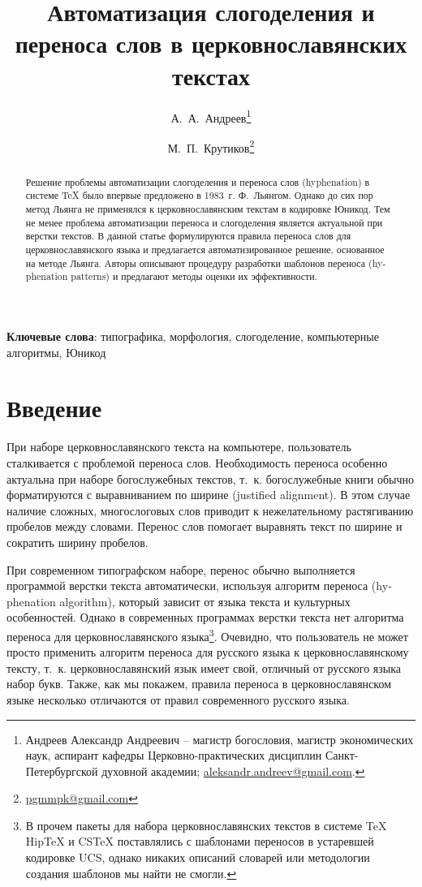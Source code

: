 \documentclass[12pt,a4paper,oneside]{extarticle}
\title{Автоматизация слогоделения и переноса слов в церковнославянских текстах}
\author{А.~А.~Андреев\thanks{Андреев Александр Андреевич -- магистр богословия, магистр экономических наук, аспирант кафедры Церковно-практических дисциплин Санкт-Петербургской духовной академии; \url{aleksandr.andreev@gmail.com}.} \and М.~П.~Крутиков\thanks{\url{pgmmpk@gmail.com}}}
\date{\vspace{-1em}}  %
\providecommand{\keywords}[1]{\textbf{Ключевые слова}: #1}
\begin{document}
\maketitle

\begin{abstract}
Решение проблемы автоматизации слогоделения и переноса слов
(\textenglish{hyphenation}) в системе \TeX{} было впервые предложено в 1983~г.
Ф.~Льянгом. Однако до сих пор метод Льянга не применялся к
церковнославянским текстам в кодировке Юникод. Тем не менее проблема
автоматизации переноса и слогоделения является актуальной при
верстки текстов. В данной статье формулируются правила переноса слов
для церковнославянского языка и предлагается автоматизированное решение,
основанное на методе Льянга. Авторы описывают процедуру разработки
шаблонов переноса (\textenglish{hyphenation patterns})
и предлагают методы оценки их эффективности.
\end{abstract}

\keywords{типографика, морфология, слогоделение, компьютерные алгоритмы, Юникод}

\section{Введение}

При наборе церковнославянского текста на компьютере, пользователь сталкивается с проблемой переноса слов. Необходимость переноса особенно актуальна при наборе богослужебных текстов, т.~к. богослужебные книги обычно форматируются с выравниванием по ширине (\textenglish{justified alignment}). В этом случае наличие сложных, многослоговых слов приводит к нежелательному растягиванию пробелов между словами. Перенос слов помогает выравнять текст по ширине и сократить ширину пробелов.

При современном типографском наборе, перенос обычно выполняется программой верстки текста автоматически, используя алгоритм переноса (\textenglish{hyphenation algorithm}), который зависит от языка текста и культурных особенностей. Однако в современных программах верстки текста нет алгоритма переноса для церковнославянского языка\footnote{В прочем пакеты для набора церковнославянских текстов в системе \TeX{} HipTeX и CSTeX поставлялись с шаблонами переносов в устаревшей кодировке UCS, однако никаких описаний словарей или методологии создания шаблонов мы найти не смогли.}. Очевидно, что пользователь не может просто применить алгоритм переноса для русского языка к церковнославянскому тексту, т.~к. церковнославянский язык имеет свой, отличный от русского языка набор букв. Также, как мы покажем, правила переноса в церковнославянском языке несколько отличаются от правил современного русского языка.
\end{document}

